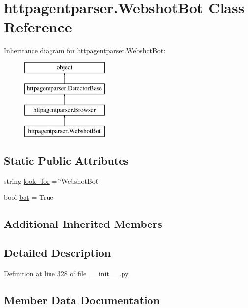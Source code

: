 \hypertarget{classhttpagentparser_1_1_webshot_bot}{}\section{httpagentparser.\+Webshot\+Bot Class Reference}
\label{classhttpagentparser_1_1_webshot_bot}
Inheritance diagram for httpagentparser.\+Webshot\+Bot\+:\begin{figure}[H]
\begin{center}
\leavevmode
\includegraphics[height=4.000000cm]{classhttpagentparser_1_1_webshot_bot}
\end{center}
\end{figure}
\subsection*{Static Public Attributes}
\begin{DoxyCompactItemize}
\item 
string \hyperlink{classhttpagentparser_1_1_webshot_bot_a017ef0f181bb36ff218ac52e3788b8d7}{look\+\_\+for} = \char`\"{}Webshot\+Bot\char`\"{}
\item 
bool \hyperlink{classhttpagentparser_1_1_webshot_bot_ae4d765a324f47e29e4df902f69a49a8a}{bot} = True
\end{DoxyCompactItemize}
\subsection*{Additional Inherited Members}


\subsection{Detailed Description}


Definition at line 328 of file \+\_\+\+\_\+init\+\_\+\+\_\+.\+py.



\subsection{Member Data Documentation}
\hypertarget{classhttpagentparser_1_1_webshot_bot_ae4d765a324f47e29e4df902f69a49a8a}{}\label{classhttpagentparser_1_1_webshot_bot_ae4d765a324f47e29e4df902f69a49a8a} 
